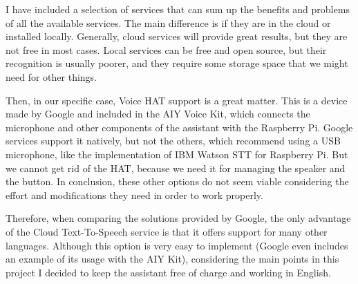 I have included a selection of services that can sum up the benefits and problems of all the available services. The main difference 
is if they are in the cloud or installed locally. Generally, cloud services will provide great results, but they are not free in 
most cases. Local services can be free and open source, but their recognition is usually poorer, and they require some storage 
space that we might need for other things.

Then, in our specific case, Voice HAT support is a great matter. This is a device made by Google and included in the AIY Voice Kit, 
which connects the microphone and other components of the assistant with the Raspberry Pi. Google services support it natively, 
but not the others, which recommend using a USB microphone, like the implementation of IBM Watson STT for Raspberry Pi. But we 
cannot get rid of the HAT, because we need it for managing the speaker and the button. In conclusion, these other options do not 
seem viable considering the effort and modifications they need in order to work properly.

Therefore, when comparing the solutions provided by Google, the only advantage of the Cloud Text-To-Speech service is that it offers 
support for many other languages. Although this option is very easy to implement (Google even includes an example of its usage with 
the AIY Kit), considering the main points in this project I decided to keep the assistant free of charge and working in English.
